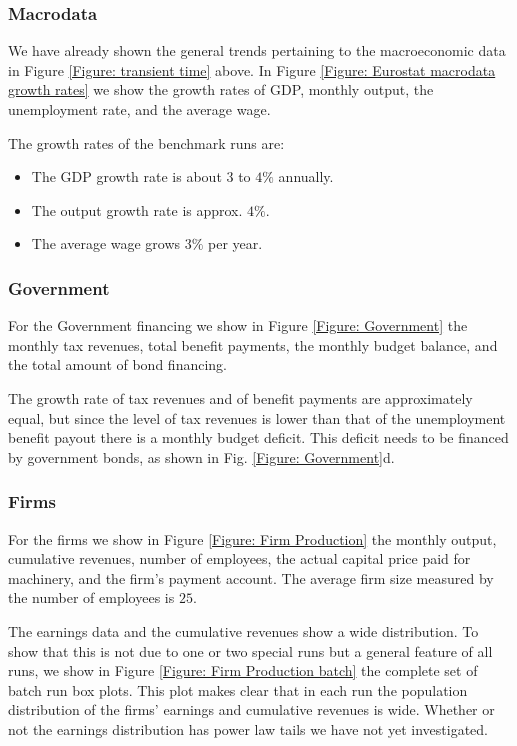 \subsubsection*{Macrodata}
We have already shown the general trends pertaining to the macroeconomic data in Figure \ref{Figure: transient time} above. 
In Figure \ref{Figure: Eurostat macrodata growth rates} we show the growth rates of GDP, monthly output, the unemployment rate, and the average wage.

The growth rates of the benchmark runs are:
\begin{itemize}
\item The GDP growth rate is about $3$ to $4\%$ annually.
\item The output growth rate is approx. $4\%$.
\item The average wage grows $3\%$ per year.
\end{itemize}

\subsubsection*{Government}
For the Government financing we show in Figure \ref{Figure: Government} the monthly tax revenues, total benefit payments, the monthly budget balance,
and the total amount of bond financing.

The growth rate of tax revenues and of benefit payments are approximately equal, but
since the level of tax revenues is lower than that of the unemployment benefit payout there is a monthly budget deficit.
This deficit needs to be financed by government bonds, as shown in Fig. \ref{Figure: Government}d.

\subsubsection*{Firms}
For the firms we show in Figure \ref{Figure: Firm Production} the monthly output, cumulative revenues, number of employees, the actual capital price paid for machinery, and the firm's payment account. The average firm size measured by the number of employees is $25$.

The earnings data and the cumulative revenues show a wide distribution. To show that this is not due to one or two special runs but a general feature of all runs, we  show in Figure \ref{Figure: Firm Production batch} the complete set of batch run box plots. This plot makes clear that in each run the population distribution of the firms' earnings and cumulative revenues is wide.
Whether or not the earnings distribution has power law tails we have not yet investigated.

